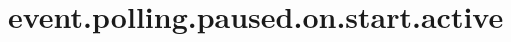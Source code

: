 \section{event.polling.paused.on.start.active}
\label{configuration:EventPollingPausedOnStartActive}
\AvailableInJavaAndCsharp{\TODO}